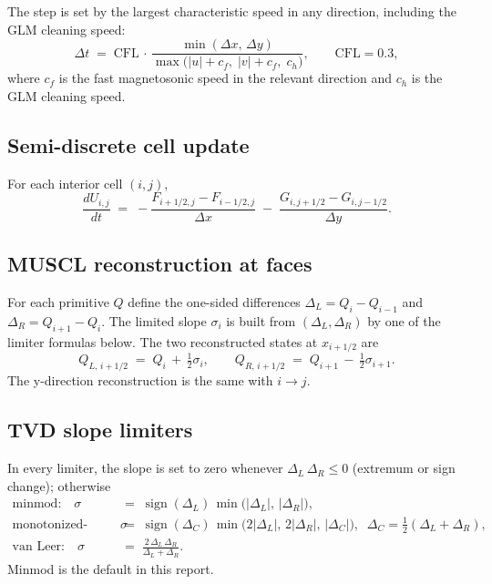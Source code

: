 \documentclass[11pt]{article}
\begin{document}
The step is set by the largest characteristic speed in any direction, including the GLM cleaning speed:
\begin{equation}
\Delta t \;=\; \mathrm{CFL}\,\cdot\,
  \frac{\min(\Delta x,\,\Delta y)}
       {\max\!\bigl(|u|+c_f,\;|v|+c_f,\;c_h\bigr)},
\qquad \mathrm{CFL}=0.3,
\label{eq:cfl-app}
\end{equation}
where $c_f$ is the fast magnetosonic speed in the relevant direction and $c_h$ is the GLM cleaning speed.

\subsection{Semi-discrete cell update}

For each interior cell $(i,j)$,
\begin{equation}
\frac{dU_{i,j}}{dt}
  \;=\; -\frac{F_{i+1/2,j} - F_{i-1/2,j}}{\Delta x}
        \;-\;\frac{G_{i,j+1/2} - G_{i,j-1/2}}{\Delta y}.
\label{eq:semi-discrete-app}
\end{equation}

\subsection{MUSCL reconstruction at faces}

For each primitive $Q$ define the one-sided differences $\Delta_L = Q_i - Q_{i-1}$ and $\Delta_R = Q_{i+1} - Q_i$.  The limited slope $\sigma_i$ is built from $(\Delta_L,\Delta_R)$ by one of the limiter formulas below.  The two reconstructed states at $x_{i+1/2}$ are
\begin{equation}
Q_{L,\,i+1/2} \;=\; Q_i \,+\, \tfrac{1}{2}\sigma_i,
\qquad
Q_{R,\,i+1/2} \;=\; Q_{i+1} \,-\, \tfrac{1}{2}\sigma_{i+1}.
\label{eq:muscl-app}
\end{equation}
The y-direction reconstruction is the same with $i \to j$.

\subsection{TVD slope limiters}

In every limiter, the slope is set to zero whenever $\Delta_L\,\Delta_R \le 0$ (extremum or sign change); otherwise
\begin{align}
\text{minmod:}\quad
  \sigma &\;=\; \operatorname{sign}(\Delta_L)\,\min\!\bigl(|\Delta_L|,\,|\Delta_R|\bigr),
  \label{eq:limiters-app}\\
\text{monotonized-central (MC):}\quad
  \sigma &\;=\; \operatorname{sign}(\Delta_C)\,\min\!\bigl(2|\Delta_L|,\,2|\Delta_R|,\,|\Delta_C|\bigr),
  \;\;\Delta_C = \tfrac{1}{2}(\Delta_L + \Delta_R), \\
\text{van Leer:}\quad
  \sigma &\;=\; \frac{2\,\Delta_L\,\Delta_R}{\Delta_L + \Delta_R}.
\end{align}
Minmod is the default in this report.
\end{document}
